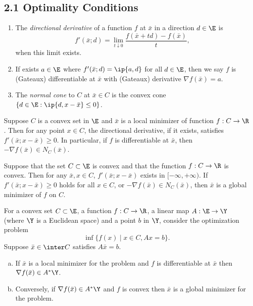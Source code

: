 \documentclass[../borwein-lewis_notes.tex]{subfiles}
\begin{document}
\maketitle
\subsection{2.1 Optimality Conditions}
\begin{enumerate}
\item The \textit{directional derivative} of a function $f$ at 
$\bar x$ in a direction $d\in\E$ is 
\begin{equation*}
f'(\bar x; d) = \lim_{t\downarrow 0} \frac{f(\bar x+td)-f(\bar x)}{t},
\end{equation*}
when this limit exists. 
\item If exists $a\in\E$ where $f'(\bar x;d) = \ip{a,d}$ for all $d\in\E$,
then we say $f$ is (Gateaux) differentiable at $\bar x$ with 
(Gateaux) derivative $\nabla f(\bar x)= a$.
\item The \textit{normal cone} to $C$ at $\bar x\in C$ is the convex cone 
$\{d\in\E : \ip{d, x-\bar x}\leq 0\}$.
\end{enumerate}
\begin{proposition}
Suppose $C$ is a convex set in $\E$ and $\bar x$ is a local minimizer of 
function $f: C\to\R$. Then for any point $x\in C$, the directional 
derivative, if it exists, satisfies $f'(\bar x; x-\bar x)\geq 0$. 
In particular, if $f$ is differentiable at $\bar x$, then $-\nabla f(\bar x)
\in N_C(\bar x)$.
\end{proposition}
\begin{proposition} 
Suppose that the set $C\subset\E$ is convex and that the function $f:C
\to\R$ is convex. Then for any $\bar x,x\in C$, $f'(\bar x;x-\bar x)$ 
exists in $[-\infty,+\infty)$. If $f'(\bar x;x-\bar x)\geq 0$ holds 
for all $x\in C$, or $-\nabla f(\bar x)\in N_C(\bar x)$, then $\bar x$ 
is a global minimizer of $f$ on $C$.
\end{proposition}
\begin{corollary}
For a convex set $C\subset\E$, a function $f:C\to\R$, a linear map 
$A:\E\to\Y$ (where $\Y$ is a Euclidean space) and a point $b$ in $\Y$,
consider the optimization problem 
\begin{equation*}
\inf\{f(x)\mid x\in C,Ax=b\}.
\end{equation*}
Suppose $\bar x\in\inter C$ satisfies $A\bar x=b$.
\begin{enumerate}[(a)]
\item If $\bar x$ is a local minimizer for the problem and $f$ is 
differentiable at $\bar x$ then $\nabla f(\bar x)\in A^*\Y$.
\item Conversely, if $\nabla f(\bar x)\in A^*\Y$ and $f$ is convex 
then $\bar x$ is a global minimizer for the problem.
\end{enumerate}
\end{corollary}
\end{document}
